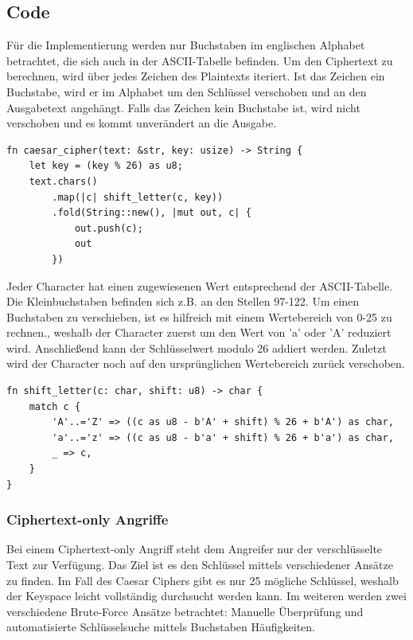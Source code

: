 \documentclass{article}
\begin{document}
    \subsection{Code}
    Für die Implementierung werden nur Buchstaben im englischen Alphabet betrachtet, die sich auch in der ASCII-Tabelle befinden.
    Um den Ciphertext zu berechnen, wird über jedes Zeichen des Plaintexts iteriert. Ist das Zeichen ein Buchstabe, wird
    er im Alphabet um den Schlüssel verschoben und an den Ausgabetext angehängt. Falls das Zeichen kein Buchstabe ist, wird 
    nicht verschoben und es kommt unverändert an die Ausgabe.
    \begin{verbatim}
fn caesar_cipher(text: &str, key: usize) -> String {
    let key = (key % 26) as u8;
    text.chars()
        .map(|c| shift_letter(c, key))
        .fold(String::new(), |mut out, c| {
            out.push(c);
            out
        })
    \end{verbatim}
    Jeder Character hat einen zugewiesenen Wert entsprechend der ASCII-Tabelle. Die Kleinbuchstaben befinden sich z.B. an
    den Stellen 97-122. Um einen Buchstaben zu verschieben, ist es hilfreich mit einem Wertebereich von 0-25 zu rechnen.,
    weshalb der Character zuerst um den Wert von 'a' oder 'A' reduziert wird. Anschließend kann der Schlüsselwert
    modulo 26 addiert werden. Zuletzt wird der Character noch auf den ursprünglichen Wertebereich zurück verschoben. 
    \begin{verbatim}
fn shift_letter(c: char, shift: u8) -> char {
    match c {
        'A'..='Z' => ((c as u8 - b'A' + shift) % 26 + b'A') as char,
        'a'..='z' => ((c as u8 - b'a' + shift) % 26 + b'a') as char,
        _ => c,
    }
}
    \end{verbatim}
    \subsubsection{Ciphertext-only Angriffe}
    Bei einem Ciphertext-only Angriff steht dem Angreifer nur der verschlüsselte Text zur Verfügung.
    Das Ziel ist es den Schlüssel mittels verschiedener Ansätze zu finden.
    Im Fall des Caesar Ciphers gibt es nur 25 mögliche Schlüssel, weshalb der Keyspace
    leicht vollständig durchsucht werden kann. Im weiteren werden zwei verschiedene
    Brute-Force Ansätze betrachtet: Manuelle Überprüfung und automatisierte Schlüsselsuche mittels 
    Buchstaben Häufigkeiten.
\end{document}
